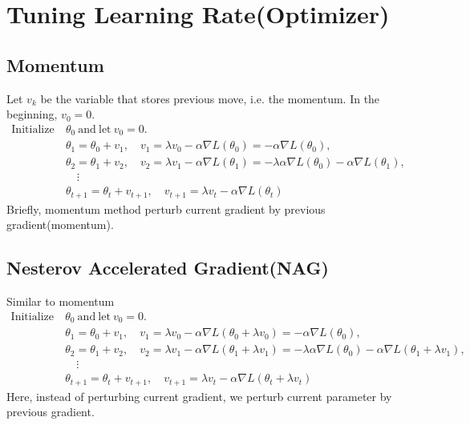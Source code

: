 \documentclass[../main.tex]{subfiles}
\begin{document}
    \section{Tuning Learning Rate(Optimizer)}
        \subsection{Momentum}
            Let $v_k$ be the variable that stores previous move, i.e. the momentum. In the beginning, $v_0=0$.
            \begin{align*}
                \mathrm{Initialize~} & \theta_0 \mathrm{~and~let~} v_0=0. \\
                & \theta_1 = \theta_0 + v_1,\quad v_1 = \lambda v_0 - \alpha \nabla L(\theta_0)=- \alpha \nabla L(\theta_0), \\
                & \theta_2 = \theta_1 + v_2,\quad v_2 = \lambda v_1 - \alpha \nabla L(\theta_1)=-\lambda\alpha \nabla L(\theta_0)- \alpha \nabla L(\theta_1), \\
                         &\quad \vdots\\
                & \theta_{t+1} = \theta_{t} + v_{t+1},\quad v_{t+1} = \lambda v_{t} - \alpha \nabla L(\theta_{t})
            \end{align*}
            Briefly, momentum method perturb current gradient by previous gradient(momentum).

        \subsection{Nesterov Accelerated Gradient(NAG)}
            Similar to momentum
            \begin{align*}
                \mathrm{Initialize~} & \theta_0 \mathrm{~and~let~} v_0 = 0. \\
                & \theta_1 = \theta_0 + v_1, \quad v_1 = \lambda v_0 - \alpha \nabla L(\theta_0 + \lambda v_0) = -\alpha \nabla L(\theta_0), \\
                & \theta_2 = \theta_1 + v_2, \quad v_2 = \lambda v_1 - \alpha \nabla L(\theta_1 + \lambda v_1) = -\lambda \alpha \nabla L(\theta_0) - \alpha \nabla L(\theta_1 + \lambda v_1), \\
                         &\quad \vdots\\
                & \theta_{t+1} = \theta_t + v_{t+1}, \quad v_{t+1} = \lambda v_t - \alpha \nabla L(\theta_t + \lambda v_t)
            \end{align*}
            Here, instead of perturbing current gradient, we perturb current parameter by previous gradient.
            
\end{document}

